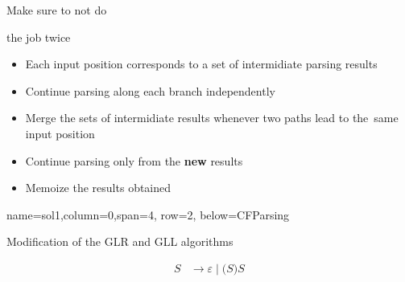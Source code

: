 \documentclass[a0paper,portrait]{baposter}
\begin{document}
\begin{poster}
{\begin{multicols}{2}
\begin{center}
\begin{multicols}{2}
\begin{center}
\vspace{0.2cm}

Make sure to not do 

the job twice
\end{center}
\end{multicols}
\end{center}

\columnbreak

\begin{minipage}[m]{\linewidth}

\vspace{2cm}

\begin{itemize}
  \item Each input position corresponds to a set of intermidiate parsing results
  \item Continue parsing along each branch independently
  \item Merge the sets of intermidiate results whenever two paths lead to the~same input position
  \item Continue parsing only from the \textbf{new} results
  \item Memoize the results obtained 
\end{itemize}


\end{minipage}
\end{multicols}
}

{name=sol1,column=0,span=4, row=2, below=CFParsing}
{ 
\begin{center}
Modification of the GLR and GLL algorithms 
\end{center}

\begin{multicols}{2}
\begin{center}
\end{center}
\columnbreak
\begin{minipage}[m]{\linewidth}
\begin{align*}
S & \rightarrow \varepsilon \mid \boldsymbol{(} S \boldsymbol{)} S 
\end{align*}
\end{minipage}
\end{multicols}

}
\end{poster}
\end{document}
